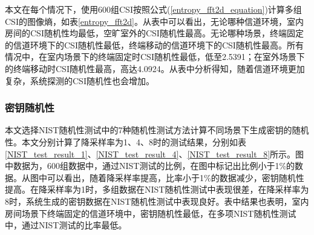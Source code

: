 \documentclass[master]{seuthesis} %
\begin{document}
\begin{Main}
\begin{table}[]
    \centering
    \caption{特殊情况的图像熵值
    \label{entropy_spectial}}
\end{table}

\begin{table}[]
    \centering
    \caption{不同场景的图像熵值
    \label{entropy_fft2d}}
\end{table}

本文在每个情况下，使用600组CSI按照公式(\ref{entropy_fft2d_equation})计算多组CSI的图像熵，如表\ref{entropy_fft2d}。从表中可以看出，无论哪种信道环境，室内房间的CSI随机性均最低，空旷室外的CSI随机性最高。无论哪种场景，终端固定的信道环境下的CSI随机性最低，终端移动的信道环境下的CSI随机性最高。所有情况中，在室内场景下的终端固定时CSI随机性最低，低至2.5391；在室外场景下的终端移动时CSI随机性最高，高达4.0924。从表中分析得知，随着信道环境更加复杂，系统探测的CSI随机性也会增加。

\subsubsection{密钥随机性}

本文选择NIST随机性测试中的7种随机性测试方法计算不同场景下生成密钥的随机性。本文分别计算了降采样率为1、4、8时的测试结果，分别如表\ref{NIST_test_result_1}、\ref{NIST_test_result_4}、\ref{NIST_test_result_8}所示。图中数据为，600组数据中，通过NIST测试的比例，在图中标记出比例小于1\%的数据。从图中可以看出，随着降采样率提高，比率小于1\%的数据减少，密钥随机性提高。在降采样率为1时，多组数据在NIST随机性测试中表现很差，在降采样率为8时，系统生成的密钥数据在NIST随机性测试中表现良好。表中结果也表明，室内房间场景下终端固定的信道环境中，密钥随机性最低，在多项NIST随机性测试中，通过NIST测试的比率最低。


\end{Main}
\end{document}
